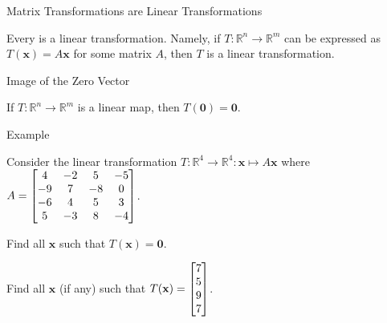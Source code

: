\documentclass[xcolor=dvipsnames,aspectratio=169,t]{beamer}
\begin{document}
\begin{frame}{Matrix Transformations are Linear Transformations}
  \begin{theorem}
    Every  is a \alert{linear transformation}. Namely, if $T\colon\mathbb{R}^n \to \mathbb{R}^m$ can be expressed as $T(\mathbf{x}) = A\mathbf{x}$ for some matrix $A$, then $T$ is a linear transformation.
    \end{theorem}

  
  
  \end{frame}

\begin{frame}{Image of the Zero Vector}

  \begin{theorem}
    If $T\colon\mathbb{R}^n \to \mathbb{R}^m$ is a linear map, then $T(\mathbf{0}) = \mathbf{0}$.
  \end{theorem}


\end{frame}


\begin{frame}{Example}

  Consider the linear transformation $T: \mathbb{R}^4 \to \mathbb{R}^4: \mathbf{x} \mapsto A\mathbf{x}$ where $\displaystyle A = \begin{bmatrix}
    4 & -2 & 5 & -5\\
    -9 & 7 & -8 & 0\\
    -6 & 4 & 5 & 3\\
    5 & -3 & 8 & -4 \end{bmatrix}$.

  \bb
  \item Find all $\mathbf{x}$ such that $T(\mathbf{x}) = \mathbf{0}$.
  \vspace*{6em}
  
  \item Find all $\mathbf{x}$ (if any) such that
    $\displaystyle T(\mathbf{x}) = \begin{bmatrix} 7\\ 5\\ 9\\ 7 \end{bmatrix}$.
  \ee
\end{frame}
  
\end{document}
